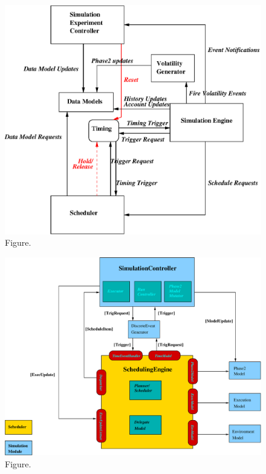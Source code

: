 \documentclass[12pt,a4paper]{article}
\begin{document}
\begin{figure}[htbp]
 \begin{center}
  \includegraphics[scale=1.0, angle=0]{figures/sim_framework_arch.eps}
 \end{center}
  \caption[Figure.]
{Figure.}
\end{figure}
\clearpage
\begin{figure}[htbp]
 \begin{center}
  \includegraphics[scale=1.0, angle=0]{figures/sim_framework.eps}
 \end{center}
  \caption[Figure.]
{Figure.}
\end{figure}
\end{document}
